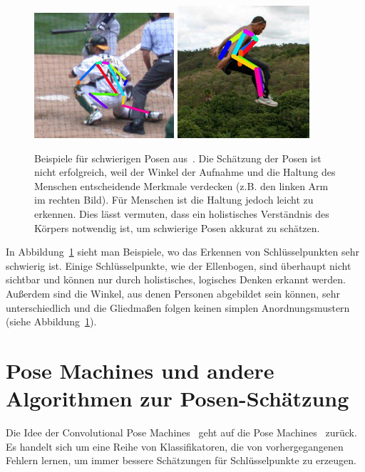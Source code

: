 \documentclass[journal, a4paper]{IEEEtran}
\begin{document}
        \begin{figure}[!hbt]
                \includegraphics[width=0.4\columnwidth]{hardpose_1.png}
                \includegraphics[width=0.35\columnwidth]{hardpose_2.png}
                \caption{Beispiele für schwierigen Posen aus~\cite{toshev2014deeppose}. Die Schätzung der Posen ist nicht erfolgreich, weil der Winkel der Aufnahme und die Haltung des Menschen entscheidende Merkmale verdecken (z.B. den linken Arm im rechten Bild). Für Menschen ist die Haltung jedoch leicht zu erkennen. Dies lässt vermuten, dass ein holistisches Verständnis des Körpers notwendig ist, um schwierige Posen akkurat zu schätzen.}
                \label{fig:hard_pose}
        \end{figure}
        In Abbildung~\ref{fig:hard_pose} sieht man Beispiele, wo das Erkennen von Schlüsselpunkten sehr schwierig ist. Einige Schlüsselpunkte, wie der Ellenbogen, sind überhaupt nicht sichtbar und können nur durch holistisches, logisches Denken erkannt werden.~\cite{toshev2014deeppose} Außerdem sind die Winkel, aus denen Personen abgebildet sein können, sehr unterschiedlich und die Gliedmaßen folgen keinen simplen Anordnungsmustern (siehe Abbildung~\ref{fig:hard_pose}).


\section{Pose Machines und andere Algorithmen zur Posen-Schätzung}
        Die Idee der Convolutional Pose Machines~\cite{conv_pose} geht auf die Pose Machines~\cite{ramakrishna2014pose} zurück. Es handelt sich um eine Reihe von Klassifikatoren, die von vorhergegangenen Fehlern lernen, um immer bessere Schätzungen für Schlüsselpunkte zu erzeugen. 
\end{document}
